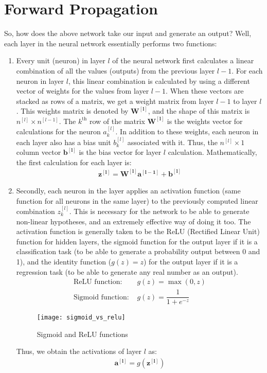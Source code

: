 \documentclass[a4paper, 12pt]{report}
\begin{document}
\section{Forward Propagation}
So, how does the above network take our input and generate an output? Well, each layer in the neural network essentially performs two functions:
\begin{enumerate}
\item Every unit (neuron) in layer $l$ of the neural network first calculates a linear combination of all the values (outputs) from the previous layer $l-1$. For each neuron in layer $l$, this linear combination is calculated by using a different vector of weights for the values from layer $l-1$. When these vectors are stacked as rows of a matrix, we get a weight matrix from layer $l-1$ to layer $l$. This weights matrix is denoted by $\bm{W^{\left[l\right]}}$, and the shape of this matrix is $n^{\left[l\right]} \times n^{\left[l-1\right]}$. The $k^{\text{th}}$ row of the matrix $\bm{W^{\left[l\right]}}$ is the weights vector for calculations for the neuron $a_{k}^{\left[l\right]}$. In addition to these weights, each neuron in each layer also has a bias unit $b_{k}^{\left[l\right]}$ associated with it. Thus, the $n^{\left[l\right]} \times 1$ column vector $\bm{b^{\left[l\right]}}$ is the bias vector for layer $l$ calculation. Mathematically, the first calculation for each layer is:
\begin{align*}
\bm{z^{\left[l\right]}} = \bm{W^{\left[l\right]}}\bm{a^{\left[l-1\right]}} + \bm{b^{\left[l\right]}}
\end{align*}
\item Secondly, each neuron in the layer applies an activation function (same function for all neurons in the same layer) to the previously computed linear combination $z_k^{\left[l\right]}$. This is necessary for the network to be able to generate non-linear hypotheses, and an extremely effective way of doing it too. The activation function is generally taken to be the ReLU (Rectified Linear Unit) function for hidden layers, the sigmoid function for the output layer if it is a classification task (to be able to generate a probability output between 0 and 1), and the identity function ($g\left(z\right) = z$) for the output layer if it is a regression task (to be able to generate any real number as an output).
\begin{align*}
\text{ReLU function: } & g\left(z\right) = \max\left(0, z\right) \\
\text{Sigmoid function: } & g\left(z\right) = \dfrac{1}{1+e^{-z}}
\end{align*}
\begin{figure}[H]
\centering
\texttt{[image: sigmoid\_vs\_relu]}
\caption{Sigmoid and ReLU functions}
\end{figure}
Thus, we obtain the activations of layer $l$ as:
\begin{align*}
\bm{a^{\left[l\right]}} = g\left(\bm{z^{\left[l\right]}}\right)
\end{align*}
\end{enumerate}
\end{document}
